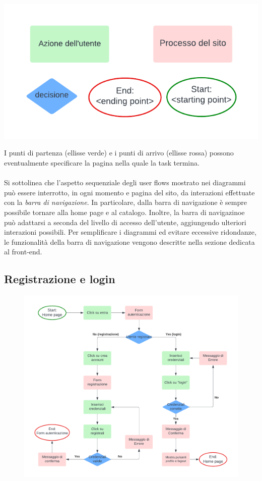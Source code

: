 \documentclass[11pt, a4paper]{article}
\theoremstyle{definition}
\begin{document}
\begin{center}
  \includegraphics{materiale/uflegenda.pdf}
\end{center}
I punti di partenza (ellisse verde) e i punti di arrivo (ellisse rossa)
possono eventualmente specificare la pagina nella quale la task
termina.
\\\\
Si sottolinea che l'aspetto sequenziale degli user flows mostrato
nei diagrammi può essere interrotto, in ogni momento e pagina del
sito, da interazioni effettuate con la \textit{barra di navigazione}.
In particolare, dalla barra di navigazione è sempre possibile tornare
alla home page e al catalogo. Inoltre, la barra di navigazinoe può
adattarsi a seconda del livello di accesso dell'utente, aggiungendo
ulteriori interazioni possibili. Per semplificare i diagrammi ed
evitare eccessive ridondanze, le funzionalità della barra di navigazione
vengono descritte nella sezione dedicata al front-end.

\subsection{Registrazione e login}
\begin{figure}[H]
\centering
\includegraphics[width = \linewidth]{materiale/ufsignuplogin.pdf}
\end{figure}
\end{document}
